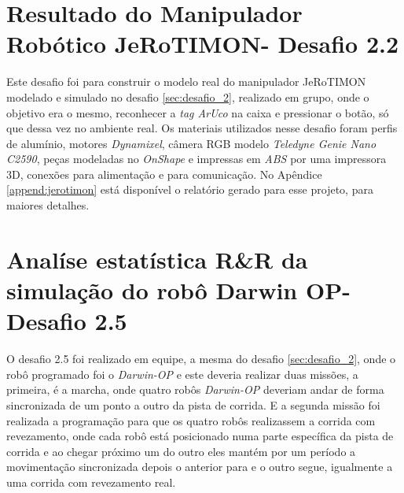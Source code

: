 

\section{Resultado do Manipulador Robótico JeRoTIMON- Desafio 2.2 }
\label{sec:desafio_2_2}
Este desafio foi para construir o modelo real do manipulador JeRoTIMON modelado e simulado no desafio \ref{sec:desafio_2}, realizado em grupo, onde o objetivo era o mesmo, reconhecer a \textit{tag ArUco} na caixa e pressionar o botão, só que dessa vez no ambiente real. Os materiais utilizados nesse desafio foram perfis de alumínio, motores \textit{Dynamixel}, câmera RGB modelo \textit{Teledyne Genie Nano C2590},  peças modeladas no \textit{OnShape} e impressas em \textit{ABS} por uma impressora 3D, conexões para alimentação e para comunicação.
No Apêndice \ref{append:jerotimon} está disponível o relatório gerado para esse projeto, para maiores detalhes.





\section{Analíse estatística R\&R da simulação do robô Darwin OP- Desafio 2.5}
\label{sec:desafio_2_5}
O desafio 2.5 foi realizado em equipe, a mesma do desafio \ref{sec:desafio_2}, onde o robô programado foi o \textit{Darwin-OP} e este deveria realizar duas missões, a primeira, é a marcha, onde quatro robôs \textit{Darwin-OP} deveriam andar de forma sincronizada de um ponto a outro da pista de corrida. E a segunda missão foi realizada a programação para que os quatro robôs realizassem a corrida com revezamento, onde cada robô está posicionado numa parte específica da pista de corrida e ao chegar próximo um do outro eles mantém por um período a movimentação sincronizada depois o anterior para e o outro segue, igualmente a uma corrida com revezamento real.

